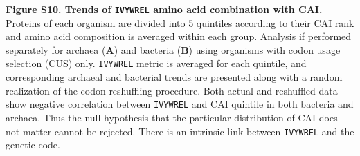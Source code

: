 \documentclass{report}
\begin{document}


{\bf Figure S10. Trends of \texttt{IVYWREL} amino acid combination with CAI.} Proteins of each organism are divided into 5 quintiles according to their CAI rank and amino acid composition is averaged within each group. Analysis if performed separately for archaea ({\bf A}) and bacteria ({\bf B}) using organisms with codon usage selection (CUS) only. \texttt{IVYWREL} metric is averaged for each quintile, and corresponding archaeal and bacterial trends are presented along with a random realization of the codon reshuffling procedure. Both actual and reshuffled data show negative correlation between \texttt{IVYWREL} and CAI quintile in both bacteria and archaea.
Thus the null hypothesis that the particular distribution of CAI does not matter cannot be rejected. There is an intrinsic link between \texttt{IVYWREL} and the genetic code.

\end{document}
